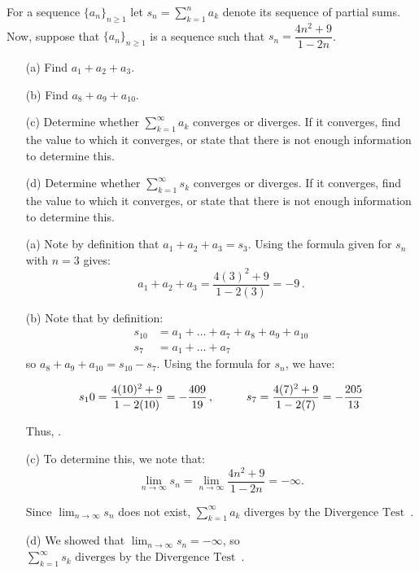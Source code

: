 \documentclass[noinstructornotes]{ximera}
\begin{document}
\begin{problem}
For a sequence $\{a_n\}_{n \geq 1}$ let $s_n = \sum^n_{k=1} a_k$ denote its sequence of partial sums.
Now, suppose that $\{a_n\}_{n \geq 1}$ is a sequence such that $s_n = \dfrac{4n^2+9}{1-2n}$.  

\begin{itemize}
\item[(a)] Find $a_1+a_2+a_3$.
\item[(b)] Find $a_8+a_9+a_{10}$.
\item[(c)] Determine whether $\displaystyle \sum_{k=1}^{\infty} a_k$ converges or diverges.  If it converges, find the value to which it converges, or state that there is not enough information to determine this.
\item[(d)] Determine whether $\displaystyle \sum_{k=1}^{\infty} s_k$ converges or diverges.  If it converges, find the value to which it converges, or state that there is not enough information to determine this.

\end{itemize}

\begin{freeResponse}

\begin{itemize}
\item[(a)] Note by definition that $a_1+a_2+a_3 = s_3$.  Using the formula given for $s_n$ with $n=3$ gives:
$$a_1+a_2+a_3 = \dfrac{4(3)^2+9}{1-2(3)} = \boxed{-9}\, .$$

\item[(b)] Note that by definition:
\begin{align*}
s_{10} &= a_1+\dots+ a_7+a_8+a_9+a_{10} \\
s_7 &= a_1+\dots +a_7
\end{align*}
so $a_8+a_9 +a_{10} = s_{10}-s_{7}$.  Using the formula for $s_n$, we have:

$$s_10 =  \dfrac{4(10)^2+9}{1-2(10)} = -\dfrac{409}{19} \, , \hspace{10 mm} s_7= \dfrac{4(7)^2+9}{1-2(7)} = - \dfrac{205}{13}$$

Thus,  . 

\item[(c)] To determine this, we note that:
$$\lim_{n \rightarrow \infty}s_n = \lim_{n \rightarrow \infty}  \dfrac{4n^2+9}{1-2n} = -\infty.$$

Since $\lim_{n \rightarrow \infty} s_n$ does not exist, $\boxed{\sum_{k=1}^{\infty} a_k  \mbox{ diverges by the Divergence Test}}$\, .

\item[(d)] We showed that $ \displaystyle \lim_{n \rightarrow \infty} s_n = -\infty$, so $\boxed{\displaystyle \sum_{k=1}^{\infty} s_k  \mbox{ diverges by the Divergence Test}}$\, .

\end{itemize}
\end{freeResponse}

\end{problem}
\end{document}
